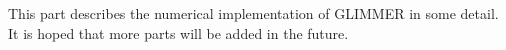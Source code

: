 This part describes the numerical implementation of GLIMMER in some detail. It is hoped that more parts will be added in the future.





